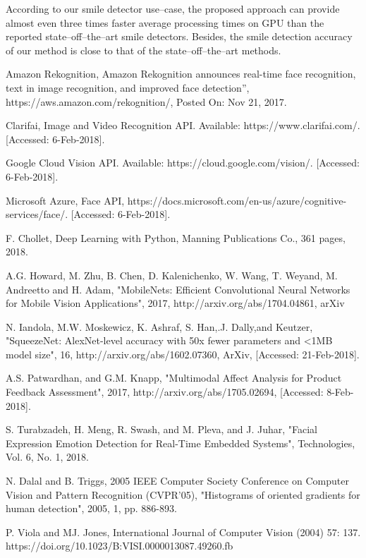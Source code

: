 \documentclass[conference]{IEEEtran}
\begin{document}
According to our smile detector use--case, the proposed approach can provide almost even three times faster average processing times on GPU than the reported state--off--the--art smile detectors. Besides, the smile detection accuracy of our method is close to that of the state--off--the--art methods.

\begin{thebibliography}{00}

 Amazon Rekognition, Amazon Rekognition announces real-time face recognition, text in image recognition, and improved face detection”, https://aws.amazon.com/rekognition/, Posted On: Nov 21, 2017.

 Clarifai, Image and Video Recognition API. Available: https://www.clarifai.com/. [Accessed: 6-Feb-2018].

 Google Cloud Vision API. Available: https://cloud.google.com/vision/. [Accessed: 6-Feb-2018].

 Microsoft Azure, Face API, https://docs.microsoft.com/en-us/azure/cognitive-services/face/. [Accessed: 6-Feb-2018].

F. Chollet, Deep Learning with Python, Manning Publications Co., 361 pages, 2018.

A.G. Howard, M. Zhu, B. Chen, D. Kalenichenko, W. Wang, T. Weyand, M. Andreetto and H. Adam, "MobileNets: Efficient Convolutional Neural Networks for Mobile Vision Applications", 2017, http://arxiv.org/abs/1704.04861, arXiv

 N. Iandola,  M.W. Moskewicz, K. Ashraf, S. Han,.J. Dally,and Keutzer, "SqueezeNet: AlexNet-level accuracy with 50x fewer parameters and {\textless}1MB model size", 16, http://arxiv.org/abs/1602.07360, ArXiv, [Accessed: 21-Feb-2018].

A.S. Patwardhan, and G.M. Knapp, "Multimodal Affect Analysis for Product Feedback Assessment", 2017, http://arxiv.org/abs/1705.02694, [Accessed: 8-Feb-2018].

S. Turabzadeh, H. Meng, R. Swash, and M. Pleva, and J. Juhar, "Facial Expression Emotion Detection for Real-Time Embedded Systems", Technologies, Vol. 6, No. 1, 2018.

N. Dalal and B. Triggs, 2005 IEEE Computer Society Conference on Computer Vision and Pattern Recognition (CVPR'05), "Histograms of oriented gradients for human detection", 2005, 1, pp. 886-893.

P. Viola and MJ. Jones, International Journal of Computer Vision (2004) 57: 137. https://doi.org/10.1023/B:VISI.0000013087.49260.fb


\end{thebibliography}
\end{document}
